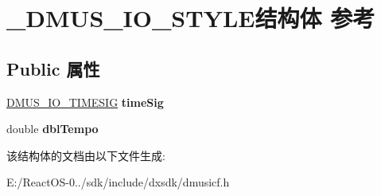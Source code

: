 \hypertarget{struct___d_m_u_s___i_o___s_t_y_l_e}{}\section{\+\_\+\+D\+M\+U\+S\+\_\+\+I\+O\+\_\+\+S\+T\+Y\+L\+E结构体 参考}
\label{struct___d_m_u_s___i_o___s_t_y_l_e}
\subsection*{Public 属性}
\begin{DoxyCompactItemize}
\item 
\mbox{\label{struct___d_m_u_s___i_o___s_t_y_l_e_a8e4eb36b62728c219baba8957d76b29a}} 
\hyperlink{struct___d_m_u_s___i_o___t_i_m_e_s_i_g}{D\+M\+U\+S\+\_\+\+I\+O\+\_\+\+T\+I\+M\+E\+S\+IG} {\bfseries time\+Sig}
\item 
\mbox{\label{struct___d_m_u_s___i_o___s_t_y_l_e_a743e0fc7ef8f284f6b9b1cee8730547a}} 
double {\bfseries dbl\+Tempo}
\end{DoxyCompactItemize}


该结构体的文档由以下文件生成\+:\begin{DoxyCompactItemize}
\item 
E\+:/\+React\+O\+S-\/0../sdk/include/dxsdk/dmusicf.\+h\end{DoxyCompactItemize}
